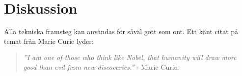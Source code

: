 \documentclass[12pt, a4paper]{article}
\begin{document}

%
%
%
%


%
%



\section{Diskussion}

Alla tekniska framsteg kan användas för såväl gott som ont. Ett känt citat på
temat från Marie Curie lyder:

\begin{quote}
	\textit{''I am one of those who think like Nobel, that humanity will draw
	more good than evil from new discoveries.''} - Marie Curie.
	\cite{curie_quote}
\end{quote}
\end{document}
